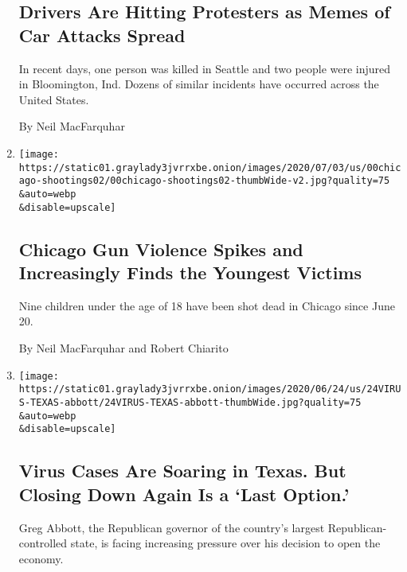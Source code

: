 \begin{enumerate}
  \hypertarget{drivers-are-hitting-protesters-as-memes-of-car-attacks-spread}{%
  \subsection{Drivers Are Hitting Protesters as Memes of Car Attacks
  Spread}\label{drivers-are-hitting-protesters-as-memes-of-car-attacks-spread}}

  In recent days, one person was killed in Seattle and two people were
  injured in Bloomington, Ind. Dozens of similar incidents have occurred
  across the United States.

  By Neil MacFarquhar
\item
  \href{/2020/07/05/us/chicago-shootings.html}{}

  \texttt{[image: https://static01.graylady3jvrrxbe.onion/images/2020/07/03/us/00chicago-shootings02/00chicago-shootings02-thumbWide-v2.jpg?quality=75\\\&auto=webp\\\&disable=upscale]}

  \hypertarget{chicago-gun-violence-spikes-and-increasingly-finds-the-youngest-victims}{%
  \subsection{Chicago Gun Violence Spikes and Increasingly Finds the
  Youngest
  Victims}\label{chicago-gun-violence-spikes-and-increasingly-finds-the-youngest-victims}}

  Nine children under the age of 18 have been shot dead in Chicago since
  June 20.

  By Neil MacFarquhar and Robert Chiarito
\item
  \href{/2020/06/24/us/coronavirus-texas-abbott-masks.html}{}

  \texttt{[image: https://static01.graylady3jvrrxbe.onion/images/2020/06/24/us/24VIRUS-TEXAS-abbott/24VIRUS-TEXAS-abbott-thumbWide.jpg?quality=75\\\&auto=webp\\\&disable=upscale]}

  \hypertarget{virus-cases-are-soaring-in-texas-but-closing-down-again-is-a-last-option}{%
  \subsection{Virus Cases Are Soaring in Texas. But Closing Down Again
  Is a `Last
  Option.'}\label{virus-cases-are-soaring-in-texas-but-closing-down-again-is-a-last-option}}

  Greg Abbott, the Republican governor of the country's largest
  Republican-controlled state, is facing increasing pressure over his
  decision to open the economy.


\end{enumerate}
